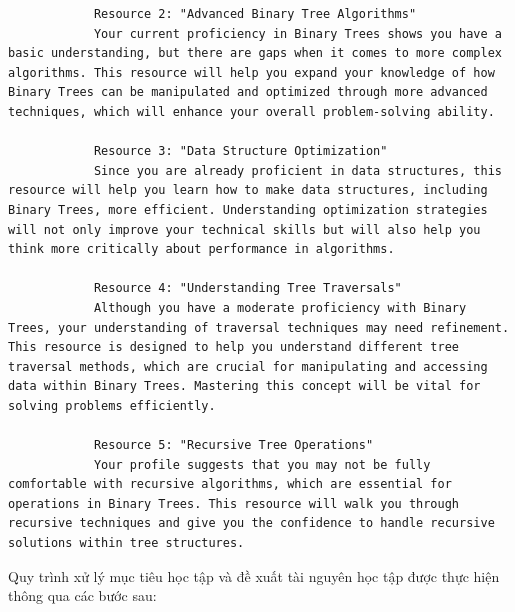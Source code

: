 \begin{verbatim}
            Resource 2: "Advanced Binary Tree Algorithms"
            Your current proficiency in Binary Trees shows you have a basic understanding, but there are gaps when it comes to more complex algorithms. This resource will help you expand your knowledge of how Binary Trees can be manipulated and optimized through more advanced techniques, which will enhance your overall problem-solving ability.

            Resource 3: "Data Structure Optimization"
            Since you are already proficient in data structures, this resource will help you learn how to make data structures, including Binary Trees, more efficient. Understanding optimization strategies will not only improve your technical skills but will also help you think more critically about performance in algorithms.

            Resource 4: "Understanding Tree Traversals"
            Although you have a moderate proficiency with Binary Trees, your understanding of traversal techniques may need refinement. This resource is designed to help you understand different tree traversal methods, which are crucial for manipulating and accessing data within Binary Trees. Mastering this concept will be vital for solving problems efficiently.

            Resource 5: "Recursive Tree Operations"
            Your profile suggests that you may not be fully comfortable with recursive algorithms, which are essential for operations in Binary Trees. This resource will walk you through recursive techniques and give you the confidence to handle recursive solutions within tree structures.
\end{verbatim}
Quy trình xử lý mục tiêu học tập và đề xuất tài nguyên học tập được thực hiện thông qua các bước sau:
